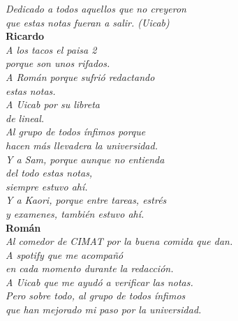 \documentclass[12pt,a4paper]{book}
\begin{document}
        
    
    \thispagestyle{empty}
    

    \begin{flushright}
      \thispagestyle{empty}

        \textit{Dedicado a todos aquellos que no creyeron\\
        que estas notas fueran a salir. (Uicab)}\\[1cm]

        \textbf{Ricardo}\\[0.3cm]
        \textit{A los tacos el paisa 2\\
        porque son unos rifados.\\
        A Román porque sufrió redactando\\
        estas notas.\\
        A Uicab por su libreta\\
        de lineal.\\
        Al grupo de todos ínfimos porque\\
        hacen más llevadera la universidad.\\
        Y a Sam, porque aunque no entienda\\
        del todo estas notas,\\
        siempre estuvo ahí.\\
        Y a Kaori, porque entre tareas, estrés\\
        y examenes, también estuvo ahí.}\\[1.2cm]


        \textbf{Román}\\[0.3cm]

        \textit{Al comedor de CIMAT por la buena comida que dan.\\
        A spotify que me acompañó\\
        en cada momento durante la redacción.\\
        A Uicab que me ayudó a verificar las notas.\\
        Pero sobre todo, al grupo de todos ínfimos \\
        que han mejorado mi paso por la universidad.}

    \end{flushright}


    \cleardoublepage
    \thispagestyle{empty}
\end{document}

